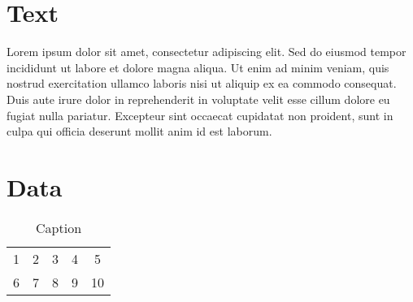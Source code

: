 \section{Text}
Lorem ipsum dolor sit amet, consectetur adipiscing elit. Sed do eiusmod tempor incididunt ut labore et dolore magna aliqua. Ut enim ad minim veniam, quis nostrud exercitation ullamco laboris nisi ut aliquip ex ea commodo consequat. Duis aute irure dolor in reprehenderit in voluptate velit esse cillum dolore eu fugiat nulla pariatur. Excepteur sint occaecat cupidatat non proident, sunt in culpa qui officia deserunt mollit anim id est laborum.

\section{Data}
\begin{table}
    \centering
    \begin{tabular}{ccccc}
        1 & 2 & 3 & 4 & 5 \\
        6 & 7 & 8 & 9 & 10 \\
    \end{tabular}
    \caption{Caption}
    \label{tab:my_label}
\end{table}


